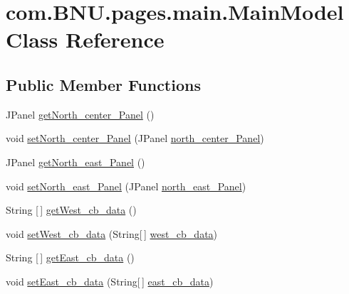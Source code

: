 \hypertarget{classcom_1_1_b_n_u_1_1pages_1_1main_1_1_main_model}{}\section{com.\+B\+N\+U.\+pages.\+main.\+Main\+Model Class Reference}
\label{classcom_1_1_b_n_u_1_1pages_1_1main_1_1_main_model}
\subsection*{Public Member Functions}
\begin{DoxyCompactItemize}
\item 
J\+Panel \mbox{\hyperlink{classcom_1_1_b_n_u_1_1pages_1_1main_1_1_main_model_a76fedcf246bdaae4511efa5cb21fa26d}{get\+North\+\_\+center\+\_\+\+Panel}} ()
\item 
void \mbox{\hyperlink{classcom_1_1_b_n_u_1_1pages_1_1main_1_1_main_model_addff3625fcdfa38626953ac3c2fc6b11}{set\+North\+\_\+center\+\_\+\+Panel}} (J\+Panel \mbox{\hyperlink{classcom_1_1_b_n_u_1_1pages_1_1main_1_1_main_model_aa78c2baa37911a78c9516ed20ea8963f}{north\+\_\+center\+\_\+\+Panel}})
\item 
J\+Panel \mbox{\hyperlink{classcom_1_1_b_n_u_1_1pages_1_1main_1_1_main_model_a94c9484d52ea589cdfe8425ad5e5c437}{get\+North\+\_\+east\+\_\+\+Panel}} ()
\item 
void \mbox{\hyperlink{classcom_1_1_b_n_u_1_1pages_1_1main_1_1_main_model_a968e57de3654cd66b6555620423f0138}{set\+North\+\_\+east\+\_\+\+Panel}} (J\+Panel \mbox{\hyperlink{classcom_1_1_b_n_u_1_1pages_1_1main_1_1_main_model_ad5cdf3cbd8a0b3d86769786ad6b39604}{north\+\_\+east\+\_\+\+Panel}})
\item 
String \mbox{[}$\,$\mbox{]} \mbox{\hyperlink{classcom_1_1_b_n_u_1_1pages_1_1main_1_1_main_model_a114e60182eb198a6d63d89c2312cf9a3}{get\+West\+\_\+cb\+\_\+data}} ()
\item 
void \mbox{\hyperlink{classcom_1_1_b_n_u_1_1pages_1_1main_1_1_main_model_afee90ef1f5d3bebcccb8e249c9c15b71}{set\+West\+\_\+cb\+\_\+data}} (String\mbox{[}$\,$\mbox{]} \mbox{\hyperlink{classcom_1_1_b_n_u_1_1pages_1_1main_1_1_main_model_af046f56b1a6221ed312ecadc6b5d7b0b}{west\+\_\+cb\+\_\+data}})
\item 
String \mbox{[}$\,$\mbox{]} \mbox{\hyperlink{classcom_1_1_b_n_u_1_1pages_1_1main_1_1_main_model_abecb02c58fbb6afbd813fafbdf4288c8}{get\+East\+\_\+cb\+\_\+data}} ()
\item 
void \mbox{\hyperlink{classcom_1_1_b_n_u_1_1pages_1_1main_1_1_main_model_aace9c5cccdbc107bdf75ebbb130b6cfa}{set\+East\+\_\+cb\+\_\+data}} (String\mbox{[}$\,$\mbox{]} \mbox{\hyperlink{classcom_1_1_b_n_u_1_1pages_1_1main_1_1_main_model_afd1d25b0c011cbf82cdb52420d59e189}{east\+\_\+cb\+\_\+data}})

\end{DoxyCompactItemize}

